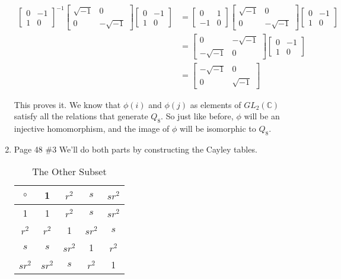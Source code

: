 \documentclass[12pt]{report}
\begin{document}
\begin{enumerate}
      \begin{align*}
        \begin{bmatrix}
          0 & -1\\
          1 &  0
        \end{bmatrix}^{-1}
        \begin{bmatrix}
          \sqrt{-1} & 0\\
          0 & -\sqrt{-1}
        \end{bmatrix}
        \begin{bmatrix}
          0 & -1\\
          1 & 0
        \end{bmatrix}
        &=
        \begin{bmatrix}
           0 & 1\\
          -1 & 0
        \end{bmatrix}
        \begin{bmatrix}
          \sqrt{-1} & 0 \\
           0 & -\sqrt{-1}
        \end{bmatrix}
        \begin{bmatrix}
          0 & -1\\
          1 & 0
        \end{bmatrix}\\
        &=
        \begin{bmatrix}
          0 & -\sqrt{-1}\\
         -\sqrt{-1} & 0
        \end{bmatrix}
        \begin{bmatrix}
          0 & -1\\
          1 & 0
        \end{bmatrix}\\
        &=
        \begin{bmatrix}
          -\sqrt{-1} & 0 \\
           0 & \sqrt{-1}
        \end{bmatrix}
      \end{align*}

      This proves it. We know that $\phi(i)$ and $\phi(j)$ as elements of
      $GL_2(\mathbb{C})$ satisfy all the relations that generate $Q_8$. So just
      like before, $\phi$ will be an injective homomorphism, and the image of
      $\phi$ will be isomorphic to $Q_8$.

\item Page 48 \#3
      We'll do both parts by constructing the Cayley tables.
      \begin{table}[h]
      \centering
      \caption{The Other Subset}
      \begin{tabular}{c|cccc}
        $\circ$ &1      &$r^2$  &$s$    &$sr^2$  \\
        \hline
        1       &1      &$r^2$  &$s$    &$sr^2$  \\
        $r^2$   &$r^2$  &1      &$sr^2$ &$s$     \\
        $s$     &$s$    &$sr^2$ &1      &$r^2$   \\
        $sr^2$  &$sr^2$ &$s$    &$r^2$  &1
      \end{tabular}
      \end{table}


\end{enumerate}
\end{document}
